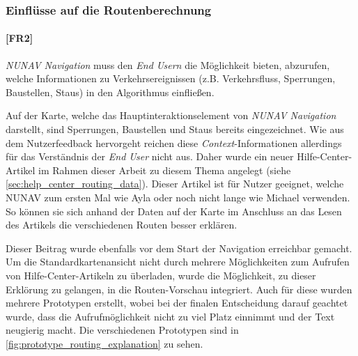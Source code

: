 \subsubsection{Einflüsse auf die Routenberechnung}

\paragraph{[FR2]} \textit{NUNAV Navigation} muss den \textit{End Usern} die Möglichkeit bieten, abzurufen, welche Informationen zu Verkehrsereignissen (z.B. Verkehrsfluss, Sperrungen, Baustellen, Staus) in den Algorithmus einfließen.

\bigskip

Auf der Karte, welche das Hauptinteraktionselement von \textit{NUNAV Navigation} darstellt, sind Sperrungen, Baustellen und Staus bereits eingezeichnet. Wie aus dem Nutzerfeedback hervorgeht reichen diese \textit{Context}-Informationen allerdings für das Verständnis der \textit{End User} nicht aus. Daher wurde ein neuer Hilfe-Center-Artikel im Rahmen dieser Arbeit zu diesem Thema angelegt (siehe \autoref{sec:help_center_routing_data}). Dieser Artikel ist für Nutzer geeignet, welche NUNAV zum ersten Mal wie Ayla oder noch nicht lange wie Michael verwenden. So können sie sich anhand der Daten auf der Karte im Anschluss an das Lesen des Artikels die verschiedenen Routen besser erklären.

Dieser Beitrag wurde ebenfalls vor dem Start der Navigation erreichbar gemacht. Um die Standardkartenansicht nicht durch mehrere Möglichkeiten zum Aufrufen von Hilfe-Center-Artikeln zu überladen, wurde die Möglichkeit, zu dieser Erklörung zu gelangen, in die Routen-Vorschau integriert. Auch für diese wurden mehrere Prototypen erstellt, wobei bei der finalen Entscheidung darauf geachtet wurde, dass die Aufrufmöglichkeit nicht zu viel Platz einnimmt und der Text neugierig macht. Die verschiedenen Prototypen sind in \autoref{fig:prototype_routing_explanation} zu sehen.


